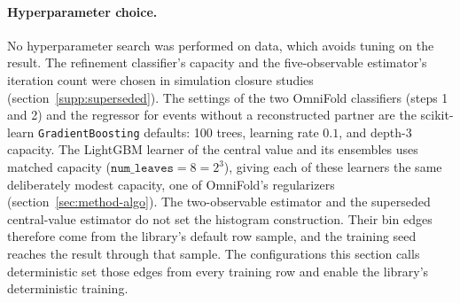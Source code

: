 \paragraph{Hyperparameter choice.} No hyperparameter search was performed on data, which avoids tuning on the result. The refinement classifier's capacity and the five-observable estimator's iteration count were chosen in simulation closure studies (section~\ref{supp:superseded}). The settings of the two OmniFold classifiers (steps 1 and 2) and the regressor for events without a reconstructed partner are the scikit-learn \texttt{GradientBoosting} defaults: 100 trees, learning rate $0.1$, and depth-3 capacity. The LightGBM learner of the central value and its ensembles uses matched capacity ($\texttt{num\_leaves}=8=2^{3}$), giving each of these learners the same deliberately modest capacity, one of OmniFold's regularizers (section~\ref{sec:method-algo}). The two-observable estimator and the superseded central-value estimator do not set the histogram construction. Their bin edges therefore come from the library's default row sample, and the training seed reaches the result through that sample. The configurations this section calls deterministic set those edges from every training row and enable the library's deterministic training.

